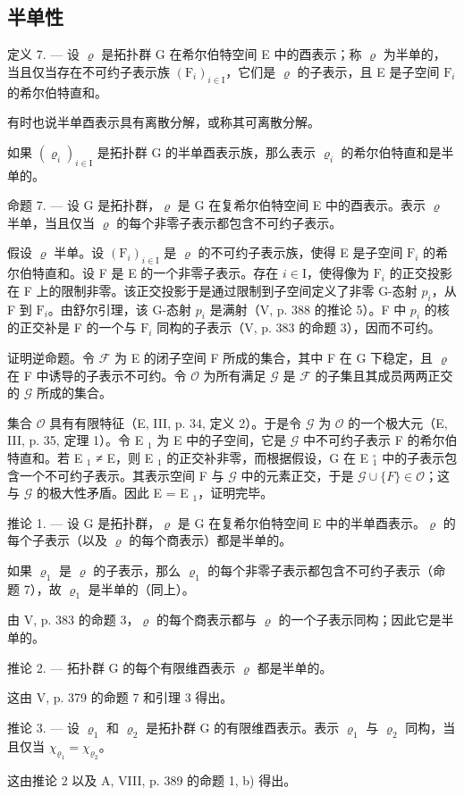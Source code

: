 \subsection{半单性}

定义 7. --- 设 \(\varrho\) 是拓扑群 G 在希尔伯特空间 E 中的酉表示；称 \(\varrho\) 为半单的，当且仅当存在不可约子表示族 \((\mathrm{F}_i)_{i\in \mathrm{I}}\)，它们是 \(\varrho\) 的子表示，且 E 是子空间 \(\mathrm{F}_i\) 的希尔伯特直和。

有时也说半单酉表示具有离散分解，或称其可离散分解。

如果 \((\varrho_{i})_{i\in\mathrm{I}}\) 是拓扑群 G 的半单酉表示族，那么表示 \(\varrho_{i}\) 的希尔伯特直和是半单的。

命题 7. --- 设 G 是拓扑群，\(\varrho\) 是 G 在复希尔伯特空间 E 中的酉表示。表示 \(\varrho\) 半单，当且仅当 \(\varrho\) 的每个非零子表示都包含不可约子表示。

假设 \(\varrho\) 半单。设 \((\mathrm{F}_i)_{i\in \mathrm{I}}\) 是 \(\varrho\) 的不可约子表示族，使得 E 是子空间 \(\mathrm{F}_i\) 的希尔伯特直和。设 F 是 E 的一个非零子表示。存在 \(i\in \mathrm{I}\)，使得像为 \(\mathrm{F}_i\) 的正交投影在 F 上的限制非零。该正交投影于是通过限制到子空间定义了非零 G-态射 \(p_i\)，从 F 到 \(\mathrm{F}_i\)。由舒尔引理，该 G-态射 \(p_i\) 是满射（V, p. 388 的推论 5）。F 中 \(p_i\) 的核的正交补是 F 的一个与 \(\mathrm{F}_i\) 同构的子表示（V, p. 383 的命题 3），因而不可约。

证明逆命题。令 \(\mathcal{F}\) 为 E 的闭子空间 F 所成的集合，其中 F 在 G 下稳定，且 \(\varrho\) 在 F 中诱导的子表示不可约。令 \(\mathcal{O}\) 为所有满足 \(\mathcal{G}\) 是 \(\mathcal{F}\) 的子集且其成员两两正交的 \(\mathcal{G}\) 所成的集合。

集合 \(\mathcal{O}\) 具有有限特征（E, III, p. 34, 定义 2）。于是令 \(\mathcal{G}\) 为 \(\mathcal{O}\) 的一个极大元（E, III, p. 35, 定理 1）。令 E \(_1\) 为 E 中的子空间，它是 \(\mathcal{G}\) 中不可约子表示 F 的希尔伯特直和。若 E \(_1\) ≠ E，则 E \(_1\) 的正交补非零，而根据假设，G 在 E \(_1^{\circ}\) 中的子表示包含一个不可约子表示。其表示空间 F 与 \(\mathcal{G}\) 中的元素正交，于是 \(\mathcal{G} \cup \{F\} \in \mathcal{O}\)；这与 \(\mathcal{G}\) 的极大性矛盾。因此 E = E \(_1\)，证明完毕。

推论 1. --- 设 G 是拓扑群，\(\varrho\) 是 G 在复希尔伯特空间 E 中的半单酉表示。\(\varrho\) 的每个子表示（以及 \(\varrho\) 的每个商表示）都是半单的。

如果 \(\varrho_{1}\) 是 \(\varrho\) 的子表示，那么 \(\varrho_{1}\) 的每个非零子表示都包含不可约子表示（命题 7），故 \(\varrho_{1}\) 是半单的（同上）。

由 V, p. 383 的命题 3，\(\varrho\) 的每个商表示都与 \(\varrho\) 的一个子表示同构；因此它是半单的。

推论 2. --- 拓扑群 G 的每个有限维酉表示 \(\varrho\) 都是半单的。

这由 V, p. 379 的命题 7 和引理 3 得出。

推论 3. --- 设 \(\varrho_{1}\) 和 \(\varrho_{2}\) 是拓扑群 G 的有限维酉表示。表示 \(\varrho_{1}\) 与 \(\varrho_{2}\) 同构，当且仅当 \(\chi_{\varrho_{1}} = \chi_{\varrho_{2}}\)。

这由推论 2 以及 A, VIII, p. 389 的命题 1, b) 得出。

